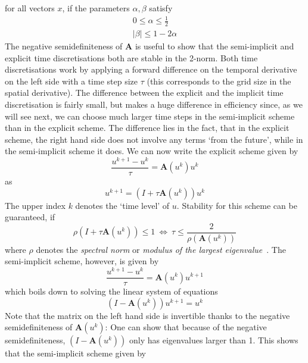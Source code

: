 for all vectors $x$, if the parameters $\alpha,\beta$ satisfy
\begin{eqnarray}
    0 \leq \alpha \leq \frac{1}{2}\\
    \vert\beta\vert \leq 1-2\alpha
\end{eqnarray}
The negative semidefiniteness of $\mathbf{A}$ is useful to show that the semi-implicit and
explicit time discretisations both are stable in the 2-norm.\newpage\noindent
Both time discretisations work by applying a forward difference on
the temporal derivative on the left side with a time step size $\tau$ (this corresponds to the grid
size in the spatial derivative). 
The difference between the explicit and the implicit time discretisation is fairly small, but makes
a huge difference in efficiency since, as we will see next, we can choose much larger time steps in
the semi-implicit scheme than in the explicit scheme. 
The difference lies in the fact, that in the explicit scheme, the right hand side does not involve any terms
`from the future', while in the semi-implicit scheme it does.
We can now write the explicit scheme given by
\begin{equation}
    \frac{u^{k+1} - u^{k}}{\tau} = \mathbf{A}(u^k)u^k
\end{equation}
as
\begin{equation}
    u^{k+1} = (I + \tau\mathbf{A}(u^k))u^k
\end{equation}
The upper index $k$ denotes the `time level' of $u$.
Stability for this scheme can be guaranteed, if 
\begin{equation}
    \rho(I + \tau\mathbf{A}(u^k)) \leq 1\ \Leftrightarrow\ \tau \leq \frac{2}{\rho(\mathbf{A}(u^k))}
\end{equation}
where $\rho$ denotes the \textit{spectral norm} or \textit{modulus of the largest
eigenvalue}~\cite{www13}.
The semi-implicit scheme, however, is given by
\begin{equation}
    \frac{u^{k+1} - u^{k}}{\tau} = \mathbf{A}(u^k)u^{k+1}
\end{equation}
which boils down to solving the linear system of equations
\begin{equation}
    (I-\mathbf{A}(u^k))u^{k+1} = u^k\label{eq:SemiImpl}
\end{equation}
Note that the matrix on the left hand side is invertible thanks to the negative semidefiniteness of
$\mathbf{A}(u^k)$: One can show that because of the negative semidefiniteness, $(I-\mathbf{A}(u^k))$ only has eigenvalues
larger than 1.
This shows that the semi-implicit scheme given by 
